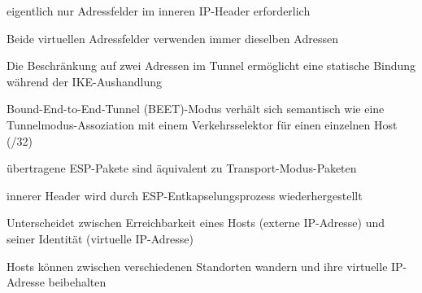 \documentclass[a4paper]{article}
\begin{document}
\begin{multicols}{3}
\begin{itemize*}
            \item eigentlich nur Adressfelder im inneren IP-Header erforderlich %
            \item Beide virtuellen Adressfelder verwenden immer dieselben Adressen %
            \item Die Beschränkung auf zwei Adressen im Tunnel ermöglicht eine statische Bindung während der IKE-Aushandlung
            \item Bound-End-to-End-Tunnel (BEET)-Modus verhält sich semantisch wie eine Tunnelmodus-Assoziation mit einem Verkehrsselektor für einen einzelnen Host (/32)
            \item übertragene ESP-Pakete sind äquivalent zu Transport-Modus-Paketen %
            \item innerer Header wird durch ESP-Entkapselungsprozess wiederhergestellt
            \item Unterscheidet zwischen Erreichbarkeit eines Hosts (externe IP-Adresse) und seiner Identität (virtuelle IP-Adresse)
            \item Hosts können zwischen verschiedenen Standorten wandern und ihre virtuelle IP-Adresse beibehalten %
      \end{itemize*}


\end{multicols}
\end{document}
